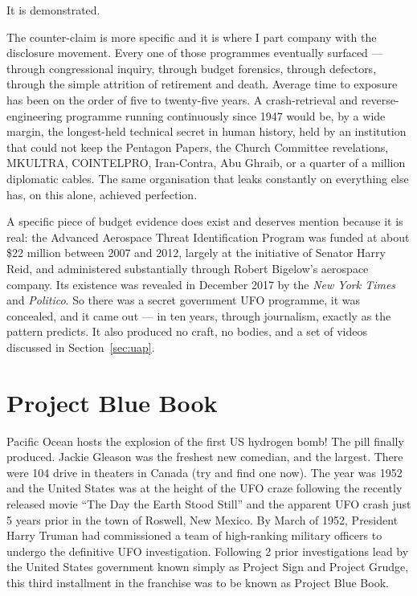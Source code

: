  It is demonstrated.

The counter-claim is more specific and it is where I part company with the disclosure movement.
Every one of those programmes eventually surfaced --- through congressional inquiry, through
budget forensics, through defectors, through the simple attrition of retirement and death.
Average time to exposure has been on the order of five to twenty-five years. A crash-retrieval
and reverse-engineering programme running continuously since 1947 would be, by a wide margin,
the longest-held technical secret in human history, held by an institution that could not keep
the Pentagon Papers, the Church Committee revelations, MKULTRA, COINTELPRO, Iran-Contra,
Abu Ghraib, or a quarter of a million diplomatic cables. The same organisation that leaks
constantly on everything else has, on this alone, achieved perfection.

\begin{funfact}
A specific piece of budget evidence does exist and deserves mention because it is real: the
Advanced Aerospace Threat Identification Program was funded at about \$22 million between 2007
and 2012, largely at the initiative of Senator Harry Reid, and administered substantially
through Robert Bigelow's aerospace company. Its existence was revealed in December 2017 by the
\emph{New York Times} and \emph{Politico}. So there was a secret government UFO programme, it
was concealed, and it came out --- in ten years, through journalism, exactly as the pattern
predicts. It also produced no craft, no bodies, and a set of videos discussed in Section~\ref{sec:uap}.
\end{funfact}

\section{Project Blue Book}\label{sec:bluebook}

Pacific Ocean hosts the explosion of the first US hydrogen bomb! The pill finally produced.
Jackie Gleason was the freshest new comedian, and the largest. There were 104 drive in theaters
in Canada (try and find one now). The year was 1952 and the United States was at the height of
the UFO craze following the recently released movie ``The Day the Earth Stood Still'' and the
apparent UFO crash just 5 years prior in the town of Roswell, New Mexico. By March of 1952,
President Harry Truman had commissioned a team of high-ranking military officers to undergo the
definitive UFO investigation. Following 2 prior investigations lead by the United States
government known simply as Project Sign and Project Grudge, this third installment in the
franchise was to be known as Project Blue Book.

